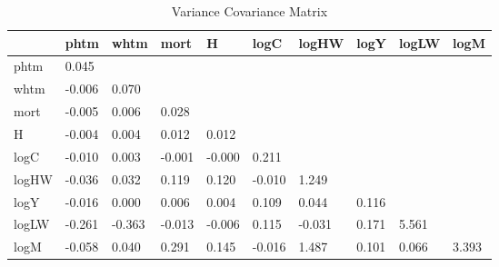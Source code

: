 \begin{table}[htbp]
\caption{\label{clabel} Variance Covariance Matrix}\centering\medskip
\begin{tabular}{llllllllll} \hline \hline
 & phtm  & whtm  & mort  & H  & logC  & logHW  & logY  & logLW  & logM  \\  \hline 
phtm &     0.045 \\  
whtm &    -0.006 &     0.070 \\  
mort &    -0.005 &     0.006 &     0.028 \\  
H &    -0.004 &     0.004 &     0.012 &     0.012 \\  
logC &    -0.010 &     0.003 &    -0.001 &    -0.000 &     0.211 \\  
logHW &    -0.036 &     0.032 &     0.119 &     0.120 &    -0.010 &     1.249 \\  
logY &    -0.016 &     0.000 &     0.006 &     0.004 &     0.109 &     0.044 &     0.116 \\  
logLW &    -0.261 &    -0.363 &    -0.013 &    -0.006 &     0.115 &    -0.031 &     0.171 &     5.561 \\  
logM &    -0.058 &     0.040 &     0.291 &     0.145 &    -0.016 &     1.487 &     0.101 &     0.066 &     3.393 \\  
\hline \hline \end{tabular}
\end{table}
